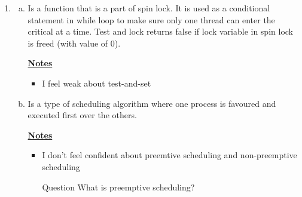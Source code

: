 \documentclass[12pt]{article}
\begin{document}
\begin{enumerate}[1.]
\begin{enumerate}[1)]
        \item

        \begin{enumerate}[a)]
            \item Is a function that is a part of spin lock. It is used as a conditional statement in while
            loop to make sure only one thread can enter the critical at a time. Test and lock returns false
            if lock variable in spin lock is freed (with value of 0).

            \bigskip

            \underline{\textbf{Notes}}

            \begin{itemize}
                \item I feel weak about test-and-set
            \end{itemize}

            \item

            Is a type of scheduling algorithm where one process is favoured and executed first
            over the others.

            \bigskip

            \underline{\textbf{Notes}}

            \begin{itemize}
                \item I don't feel confident about preemtive scheduling and non-preemptive scheduling
                \item [\color{blue}Question\color{black}] What is preemptive scheduling?
            \end{itemize}
        \end{enumerate}
    \end{enumerate}


\end{enumerate}
\end{document}
